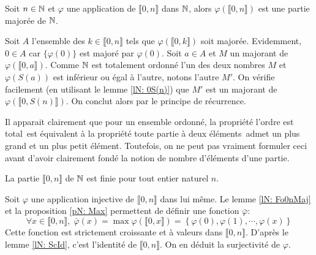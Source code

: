 \begin{lemn}\label{lN: Fo0nMaj}
 Soit $n\in\mathbb{N}$ et $\varphi$ une application de $\llbracket 0,n \rrbracket$ dans $\mathbb{N}$, alors $\varphi(\llbracket 0,n \rrbracket)$ est une partie majorée de $\mathbb{N}$.
\end{lemn}
\begin{demo}
Soit $A$ l'ensemble des $k\in \llbracket 0,n \rrbracket$ tels que  $\varphi(\llbracket 0,k \rrbracket)$ soit majorée.\newline
Evidemment, $0\in A$ car $\lbrace \varphi(0) \rbrace$ est majoré par $\varphi(0)$.\newline
Soit $a\in A$ et $M$ un majorant de $\varphi(\llbracket 0,a \rrbracket)$. Comme $\mathbb{N}$ est totalement ordonné l'un des deux nombres $M$ et $\varphi(S(a))$ est inférieur ou égal à l'autre, notons l'autre $M'$. On vérifie facilement (en utilisant le lemme \ref{lN: 0S(n)}) que $M'$ est un majorant de $\varphi(\llbracket 0,S(n) \rrbracket)$. On conclut alors par le principe de récurrence.
\end{demo}

\begin{rem}
 Il apparait clairement que pour un ensemble ordonné, la propriété \og l'ordre est total\fg \ est équivalent à la propriété \fg toute partie à deux éléments\fg \ admet un plus grand et un plus petit élément. Toutefois, on ne peut pas vraiment formuler ceci avant d'avoir clairement fondé la notion de nombre d'éléments d'une partie.
\end{rem}

\begin{prop}[\ref{pN: 0nFini}]
 La partie $\llbracket 0, n\rrbracket$ de $\mathbb{N}$ est finie pour tout entier naturel $n$.
\end{prop}
\begin{demo}
 Soit $\varphi$ une application injective de $\llbracket 0,n \rrbracket$ dans lui même. Le lemme \ref{lN: Fo0nMaj} et la proposition \ref{pN: Max} permettent de définir une fonction $\bar{\varphi}$:
\begin{displaymath}
 \forall x\in \llbracket 0,n \rrbracket,\; \bar{\varphi}(x) = \max \varphi(\llbracket 0,x \rrbracket) = \left\lbrace \varphi(0), \varphi(1), \cdots ,\varphi(x)\right\rbrace 
\end{displaymath}
Cette fonction est strictement croissante et à valeurs dans $\llbracket 0,n \rrbracket$. D'après le lemme \ref{lN: ScId}, c'est l'identité de $\llbracket 0,n \rrbracket$. On en déduit la surjectivité de $\varphi$.
\end{demo}

